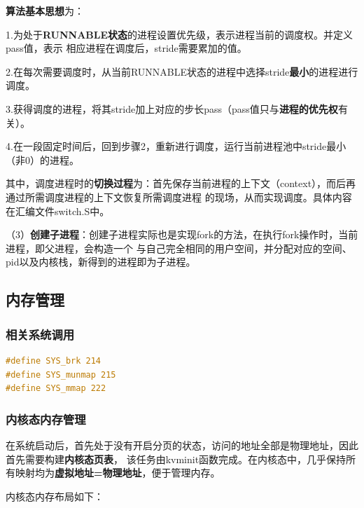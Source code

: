 \documentclass[UTF8,a4paper,10pt]{ctexart}
\begin{document}
  \textbf{算法基本思想}为：

1.为处于\textbf{RUNNABLE状态}的进程设置优先级，表示进程当前的调度权。并定义pass值，表示
相应进程在调度后，stride需要累加的值。

2.在每次需要调度时，从当前RUNNABLE状态的进程中选择stride\textbf{最小}的进程进行调度。

3.获得调度的进程，将其stride加上对应的步长pass（pass值只与\textbf{进程的优先权}有关）。

4.在一段固定时间后，回到步骤2，重新进行调度，运行当前进程池中stride最小（非0）的进程。

其中，调度进程时的\textbf{切换过程}为：首先保存当前进程的上下文（context），而后再通过所需调度进程的上下文恢复所需调度进程
的现场，从而实现调度。具体内容在汇编文件switch.S中。

（3）\textbf{创建子进程}：创建子进程实际也是实现fork的方法，在执行fork操作时，当前进程，即父进程，会构造一个
与自己完全相同的用户空间，并分配对应的空间、pid以及内核栈，新得到的进程即为子进程。

\subsection{内存管理}

\subsubsection{相关系统调用}

\begin{lstlisting}[title=内存管理系统调用,frame=trbl,language={C}]
#define SYS_brk 214
#define SYS_munmap 215
#define SYS_mmap 222
\end{lstlisting}

\subsubsection{内核态内存管理}

在系统启动后，首先处于没有开启分页的状态，访问的地址全部是物理地址，因此首先需要构建\textbf{内核态页表}，
该任务由kvminit函数完成。在内核态中，几乎保持所有映射均为\textbf{虚拟地址=物理地址}，便于管理内存。

内核态内存布局如下：
\end{document}
